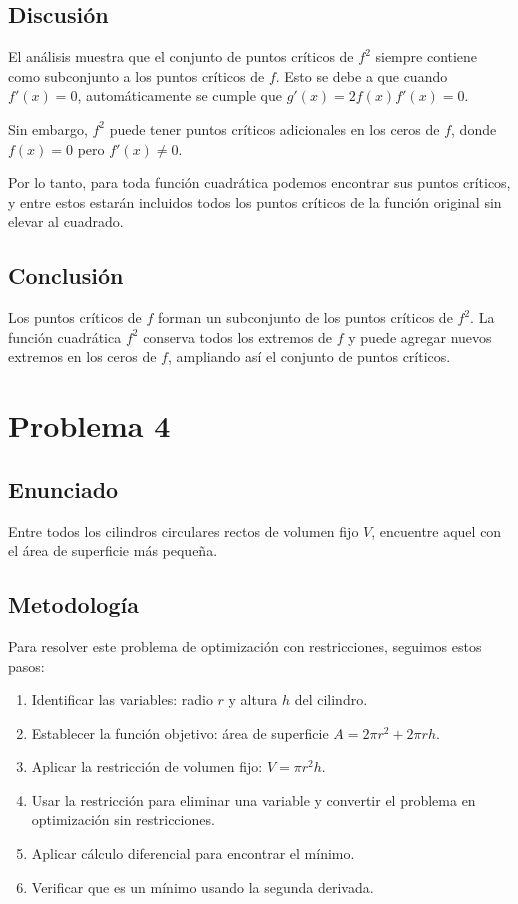 \documentclass{article}
\begin{document}
\subsection{Discusión}

El análisis muestra que el conjunto de puntos críticos de $f^2$ siempre contiene como subconjunto a los puntos críticos de $f$. Esto se debe a que cuando $f'(x) = 0$, automáticamente se cumple que $g'(x) = 2f(x)f'(x) = 0$.

Sin embargo, $f^2$ puede tener puntos críticos adicionales en los ceros de $f$, donde $f(x) = 0$ pero $f'(x) \neq 0$.

Por lo tanto, para toda función cuadrática podemos encontrar sus puntos críticos, y entre estos estarán incluidos todos los puntos críticos de la función original sin elevar al cuadrado.

\subsection{Conclusión}

Los puntos críticos de $f$ forman un subconjunto de los puntos críticos de $f^2$. La función cuadrática $f^2$ conserva todos los extremos de $f$ y puede agregar nuevos extremos en los ceros de $f$, ampliando así el conjunto de puntos críticos.

\section{Problema 4}

\subsection{Enunciado}
Entre todos los cilindros circulares rectos de volumen fijo $V$, encuentre aquel con el área de superficie más pequeña.

\subsection{Metodología}

Para resolver este problema de optimización con restricciones, seguimos estos pasos:
\begin{enumerate}
    \item Identificar las variables: radio $r$ y altura $h$ del cilindro.
    \item Establecer la función objetivo: área de superficie $A = 2\pi r^2 + 2\pi rh$.
    \item Aplicar la restricción de volumen fijo: $V = \pi r^2 h$.
    \item Usar la restricción para eliminar una variable y convertir el problema en optimización sin restricciones.
    \item Aplicar cálculo diferencial para encontrar el mínimo.
    \item Verificar que es un mínimo usando la segunda derivada.
\end{enumerate}
\end{document}
